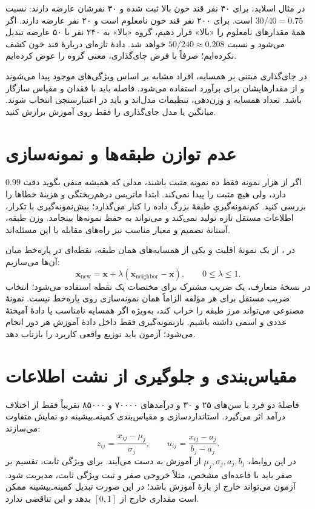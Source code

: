 \documentclass[12pt,a4paper,oneside]{report}
\newcounter{ex}[chapter]
\newenvironment{example}[1]{\refstepcounter{ex}\begin{tcolorbox}[breakable=false,title={مثال \thechapter.\arabic{ex} | #1},colframe=muted,colback=white]}{\end{tcolorbox}}
\begin{document}
\begin{example}{جای‌گذاری می‌تواند رابطه را وارونه کند}
در مثال اسلاید، برای ۴۰ نفر قند خون بالا ثبت شده و ۳۰ نفرشان عارضه دارند: نسبت $30/40=0.75$ است. برای ۲۰۰ نفر قند خون نامعلوم است و ۲۰ نفر عارضه دارند. اگر همهٔ مقدارهای نامعلوم را «بالا» قرار دهیم، گروه «بالا» به ۲۴۰ نفر با ۵۰ عارضه تبدیل می‌شود و نسبت $50/240\approx0.208$ خواهد شد. دادهٔ تازه‌ای دربارهٔ قند خون کشف نکرده‌ایم؛ صرفاً با فرض جای‌گذاری، معنی گروه را عوض کرده‌ایم.
\end{example}

در جای‌گذاری مبتنی بر همسایه، افراد مشابه بر اساس ویژگی‌های موجود پیدا می‌شوند و از مقدارهایشان برای برآورد استفاده می‌شود. فاصله باید با فقدان و مقیاس سازگار باشد. تعداد همسایه و وزن‌دهی، تنظیمات مدل‌اند و باید در اعتبارسنجی انتخاب شوند. میانگین یا مدل جای‌گذاری را فقط روی آموزش برازش کنید.

\section{عدم توازن طبقه‌ها و نمونه‌سازی}
اگر از هزار نمونه فقط ده نمونه مثبت باشند، مدلی که همیشه منفی بگوید دقت $0.99$ دارد، ولی هیچ مثبت را پیدا نمی‌کند. ابتدا ماتریس درهم‌ریختگی و هزینهٔ خطاها را بررسی کنید. کم‌نمونه‌گیریِ طبقهٔ بزرگ داده را کنار می‌گذارد؛ بیش‌نمونه‌گیری با تکرار، اطلاعات مستقل تازه تولید نمی‌کند و می‌تواند به حفظ نمونه‌ها بینجامد. وزن طبقه، آستانهٔ تصمیم و معیار مناسب نیز راه‌های مقابله با این مسئله‌اند.

در ، از یک نمونهٔ اقلیت و یکی از همسایه‌های همان طبقه، نقطه‌ای در پاره‌خط میان آن‌ها می‌سازیم:
\[\mathbf x_{\mathrm{new}}=\mathbf x+\lambda(\mathbf x_{\mathrm{neighbor}}-\mathbf x),\qquad 0\le\lambda\le1.\]
در نسخهٔ متعارف، یک ضریب مشترک برای مختصات یک نقطه استفاده می‌شود؛ انتخاب ضریب مستقل برای هر مؤلفه الزاماً همان نمونه‌سازی روی پاره‌خط نیست. نمونهٔ مصنوعی می‌تواند مرز طبقه را خراب کند، به‌ویژه اگر همسایه نامناسب یا دادهٔ آمیختهٔ عددی و اسمی داشته باشیم. بازنمونه‌گیری فقط داخل دادهٔ آموزش هر دور انجام می‌شود؛ آزمون باید توزیع واقعی کاربرد را بازتاب دهد.

\section{مقیاس‌بندی و جلوگیری از نشت اطلاعات}
فاصلهٔ دو فرد با سن‌های ۲۵ و ۳۰ و درآمدهای ۷۰۰۰۰ و ۸۵۰۰۰ تقریباً فقط از اختلاف درآمد اثر می‌گیرد. استانداردسازی و مقیاس‌بندی کمینه‌ـ‌بیشینه دو نمایش متفاوت می‌سازند:
\[z_{ij}=\frac{x_{ij}-\mu_j}{\sigma_j},\qquad u_{ij}=\frac{x_{ij}-a_j}{b_j-a_j}.\]
در این روابط، $\mu_j,\sigma_j,a_j,b_j$ از آموزش به دست می‌آیند. برای ویژگی ثابت، تقسیم بر صفر باید با قاعده‌ای مشخص، مثلاً خروجی صفر و ثبت ویژگی ثابت، مدیریت شود. آزمون می‌تواند خارج از بازهٔ آموزش باشد؛ در این صورت تبدیل کمینه‌ـ‌بیشینه ممکن است مقداری خارج از $[0,1]$ بدهد و این تناقضی ندارد.
\end{document}
